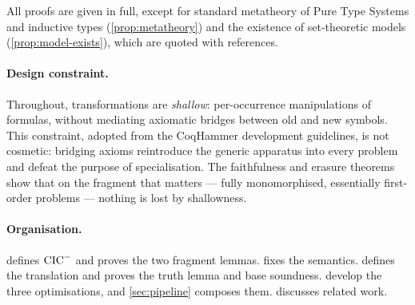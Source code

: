 All proofs are given in full, except for standard metatheory of
Pure Type Systems and inductive types
(\cref{prop:metatheory}) and the existence of set-theoretic models
(\cref{prop:model-exists}), which are quoted with references.

\paragraph{Design constraint.}
Throughout, transformations are \emph{shallow}: per-occurrence
manipulations of formulas, without mediating axiomatic bridges
between old and new symbols.  This constraint, adopted from the
CoqHammer development guidelines, is not cosmetic: bridging axioms
reintroduce the generic apparatus into every problem and defeat the
purpose of specialisation.  The faithfulness and erasure theorems
show that on the fragment that matters --- fully monomorphised,
essentially first-order problems --- nothing is lost by shallowness.

\paragraph{Organisation.}
 defines $\mathrm{CIC}^{-}$ and proves the two fragment
lemmas.   fixes the semantics.
 defines the translation and proves the truth
lemma and base soundness.   develop the three optimisations, and
\cref{sec:pipeline} composes them.   discusses
related work.
